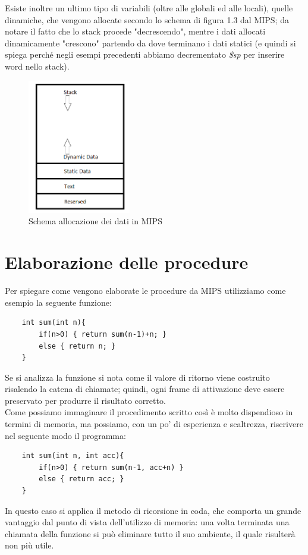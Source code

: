 \documentclass[class=book, crop=false]{standalone}
\begin{document}
Esiste inoltre un ultimo tipo di variabili (oltre alle globali ed alle locali), quelle dinamiche, che vengono allocate secondo lo schema di figura 1.3 dal MIPS; da notare il fatto che lo stack procede "decrescendo", mentre i dati allocati dinamicamente "crescono"  partendo da dove terminano i dati statici (e quindi si spiega perché negli esempi precedenti abbiamo decrementato \emph{\$sp} per inserire word nello stack).
\begin{figure}[H]
	\centering
	\caption{Schema allocazione dei dati in MIPS}
	\includegraphics[width=0.4\textwidth,keepaspectratio]{Dove-finiscono-le-variabili}
\end{figure}

\section{Elaborazione delle procedure}
Per spiegare come vengono elaborate le procedure da MIPS utilizziamo come esempio la seguente funzione:
\begin{verbatim}
	int sum(int n){
		if(n>0) { return sum(n-1)+n; }
		else { return n; }
	}
\end{verbatim}

Se si analizza la funzione si nota come il valore di ritorno viene costruito risalendo la catena di chiamate; quindi, ogni frame di attivazione deve essere preservato per produrre il risultato corretto.\\
Come possiamo immaginare il procedimento scritto così è  molto dispendioso in termini di memoria, ma possiamo, con un po' di esperienza e scaltrezza, riscrivere nel seguente modo il programma:
\begin{verbatim}
	int sum(int n, int acc){
		if(n>0) { return sum(n-1, acc+n) }
		else { return acc; }
	}
\end{verbatim}
In questo caso si applica il metodo di ricorsione in coda, che comporta un grande vantaggio dal punto di vista dell'utilizzo di memoria: una volta terminata una chiamata della funzione si può eliminare tutto il suo ambiente, il quale risulterà non più utile.
\end{document}
